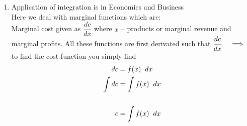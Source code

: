 \documentclass[11pt,a4paper]{article}
\begin{document}
\begin{enumerate}
\begin{enumerate}
\begin{align*}
\therefore\hspace{0.5cm} \int^3_0 f(y) \hspace{0.1cm}dy & = \int^3_0y^{1/2}\hspace{0.1cm}dy\\\\
& = \dfrac{y^{1/2+1}}{3/2}\Bigg|^3_0 = \dfrac{2}{3}\Big[3^{3/2}\Big]\\\\
& = 2\sqrt{3}\hspace{0.2cm}\text{units squared}\\\\
\end{align*}
\end{enumerate}





\item Application of integration is in Economics and Business\\
Here we deal with marginal functions which are:\\

Marginal cost given as $\dfrac{dc}{dx}$ where $x-$products or marginal revenue and marginal profits. All these functions are first derivated such that $\dfrac{dc}{dx}\hspace{0.3cm} \implies\hspace{0.2cm}$ to find the cost function you simply find
\begin{align*}
dc & = f(x)\hspace{0.2cm}dx\\
\int dc & = \int f(x)\hspace{0.2cm}dx\\\\
c & = \int f(x)\hspace{0.2cm}dx\\\\\
\end{align*}
\end{enumerate}
\end{document}
